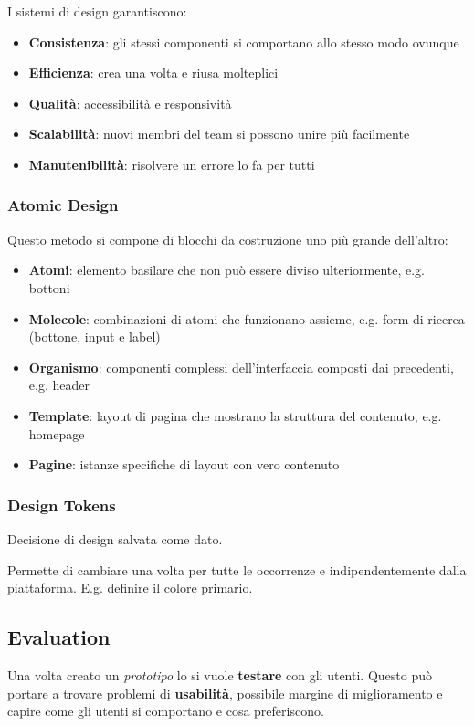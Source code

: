 \noindent I sistemi di design garantiscono:
\begin{itemize}
	\item \textbf{Consistenza}: gli stessi componenti si comportano allo stesso modo ovunque
	\item \textbf{Efficienza}: crea una volta e riusa molteplici
	\item \textbf{Qualità}: accessibilità e responsività
	\item \textbf{Scalabilità}: nuovi membri del team si possono unire più facilmente
	\item \textbf{Manutenibilità}: risolvere un errore lo fa per tutti
\end{itemize}

\subsubsection{Atomic Design}
Questo metodo si compone di blocchi da costruzione uno più grande dell'altro:
\begin{itemize}
	\item \textbf{Atomi}: elemento basilare che non può essere diviso ulteriormente, e.g. bottoni
	\item \textbf{Molecole}: combinazioni di atomi che funzionano assieme, e.g. form di ricerca (bottone, input e label)
	\item \textbf{Organismo}: componenti complessi dell'interfaccia composti dai precedenti, e.g. header
	\item \textbf{Template}: layout di pagina che mostrano la struttura del contenuto, e.g. homepage
	\item \textbf{Pagine}: istanze specifiche di layout con vero contenuto
\end{itemize}

\subsubsection{Design Tokens}
\begin{definition}
	Decisione di design salvata come dato.
\end{definition}
Permette di cambiare una volta per tutte le occorrenze e indipendentemente dalla piattaforma. E.g. definire il colore primario.

\subsection{Evaluation}
Una volta creato un \textit{prototipo} lo si vuole \textbf{testare} con gli utenti. Questo può portare a trovare problemi di \textbf{usabilità}, possibile margine di miglioramento e capire come gli utenti si comportano e cosa preferiscono.

